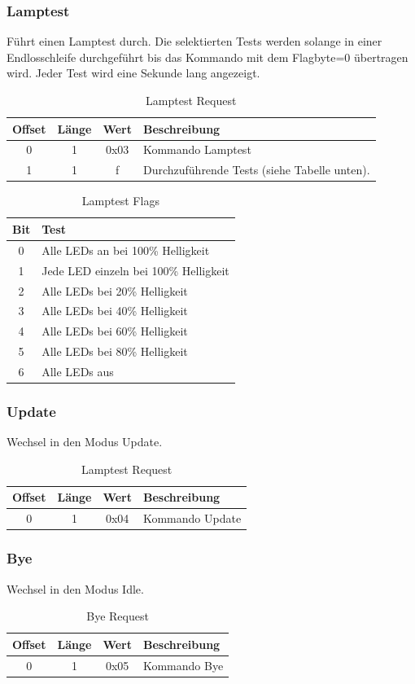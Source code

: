 \documentclass[10pt,a4paper]{article}
\begin{document}
\subsubsection{Lamptest}
\label{sec:Lamptest}
Führt einen Lamptest durch. Die selektierten Tests werden solange in einer Endlosschleife durchgeführt bis das Kommando mit dem Flagbyte=0 übertragen wird. Jeder Test wird eine Sekunde lang angezeigt.
\begin{table}[H]
\centering
\begin{tabular}{c|c|c|l}
\textbf{Offset} & \textbf{Länge} & \textbf{Wert} & \textbf{Beschreibung} \\ \hline
0 & 1 & 0x03 & Kommando Lamptest\\
1 & 1 & f & Durchzuführende Tests (siehe Tabelle unten). 
\end{tabular}
\caption{Lamptest Request}
\end{table}

\begin{table}[H]
\label{LAMPTEST_FLAGS}
\centering
\begin{tabular}{c|l}
\textbf{Bit} & \textbf{Test} \\ \hline
0 & Alle LEDs an bei 100\% Helligkeit\\
1 & Jede LED einzeln bei 100\% Helligkeit\\
2 & Alle LEDs bei 20\% Helligkeit\\
3 & Alle LEDs bei 40\% Helligkeit\\
4 & Alle LEDs bei 60\% Helligkeit\\
5 & Alle LEDs bei 80\% Helligkeit\\
6 & Alle LEDs aus
\end{tabular}
\caption{Lamptest Flags}
\end{table}

\subsubsection{Update}
\label{sec:Update}
Wechsel in den Modus Update.
\begin{table}[H]
\centering
\begin{tabular}{c|c|c|l}
\textbf{Offset} & \textbf{Länge} & \textbf{Wert} & \textbf{Beschreibung} \\ \hline
0 & 1 & 0x04 & Kommando Update
\end{tabular}
\caption{Lamptest Request}
\end{table}

\subsubsection{Bye}
\label{sec:Bye}
Wechsel in den Modus Idle.
\begin{table}[H]
\centering
\begin{tabular}{c|c|c|l}
\textbf{Offset} & \textbf{Länge} & \textbf{Wert} & \textbf{Beschreibung} \\ \hline
0 & 1 & 0x05 & Kommando Bye
\end{tabular}
\caption{Bye Request}
\end{table}
\end{document}
